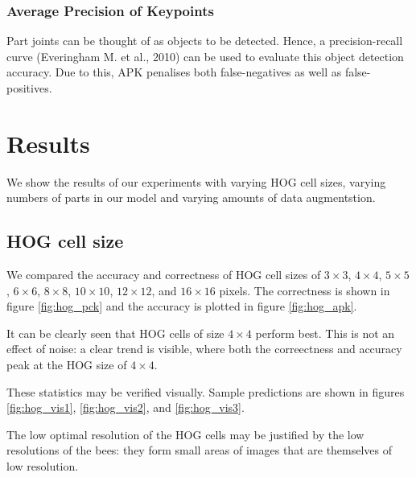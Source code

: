 \documentclass[11pt, oneside]{report}
\begin{document}
    \subsection{Average Precision of Keypoints}
        Part joints can be thought of as objects to be detected. Hence, a precision-recall curve (Everingham M. et al., 2010) can be used to evaluate this object detection accuracy. Due to this, APK penalises both false-negatives as well as false-positives.

\chapter{Results}
    We show the results of our experiments with varying HOG cell sizes, varying numbers of parts in our model and varying amounts of data augmentstion.
    \section{HOG cell size}
        We compared the accuracy and correctness of HOG cell sizes of $3\times3$, $4\times4$, $5\times5$, $6\times6$, $8\times8$, $10\times10$, $12\times12$, and $16\times16$ pixels. The correctness is shown in figure \ref{fig:hog_pck} and the accuracy is plotted in figure \ref{fig:hog_apk}.

        It can be clearly seen that HOG cells of size $4\times4$ perform best. This is not an effect of noise: a clear trend is visible, where both the correectness and accuracy peak at the HOG size of $4\times4$.

        These statistics may be verified visually. Sample predictions are shown in figures \ref{fig:hog_vis1}, \ref{fig:hog_vis2}, and \ref{fig:hog_vis3}.

        The low optimal resolution of the HOG cells may be justified by the low resolutions of the bees: they form small areas of images that are themselves of low resolution.
\end{document}
